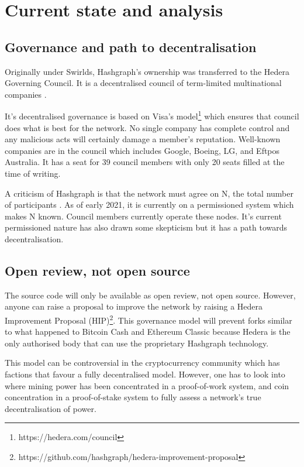 \section{Current state and analysis}

\subsection{Governance and path to decentralisation}
Originally under Swirlds, Hashgraph's ownership was transferred to the Hedera Governing Council. It is a decentralised council of term-limited multinational companies \cite{baird2018hedera}. 

It's decentralised governance is based on Visa's model\footnote{https://hedera.com/council} which ensures that council does what is best for the network. No single company has complete control and any malicious acts will certainly damage a member's reputation. Well-known companies are in the council which includes Google, Boeing, LG, and Eftpos Australia. It has a seat for 39 council members with only 20 seats filled at the time of writing.

A criticism of Hashgraph is that the network must agree on N, the total number of participants \cite{kauflin2018}. As of early 2021, it is currently on a permissioned system which makes N known. Council members currently operate these nodes. It's current permissioned nature has also drawn some skepticism but it has a path towards decentralisation.


\subsection{Open review, not open source}
The source code will only be available as open review, not open source. However, anyone can raise a proposal to improve the network by raising a Hedera Improvement Proposal (HIP)\footnote{https://github.com/hashgraph/hedera-improvement-proposal}. This governance model will prevent forks similar to what happened to Bitcoin Cash and Ethereum Classic because Hedera is the only authorised body that can use the proprietary Hashgraph technology.

This model can be controversial in the cryptocurrency community which has factions that favour a fully decentralised model. However, one has to look into where mining power has been concentrated in a proof-of-work system, and coin concentration in a proof-of-stake system to fully assess a network's true decentralisation of power.

